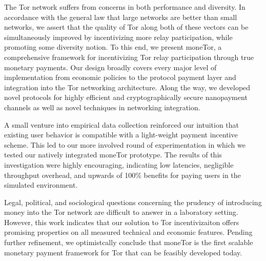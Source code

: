The Tor network suffers from concerns in both performance and diversity. In
accordance with the general law that large networks are better than small
networks, we assert that the quality of Tor along both of these vectors can be
simultaneously improved by incentivizing more relay participation, while
promoting some diversity notion. To this end, we present moneTor, a
comprehensive framework for incentivizing Tor relay participation through true
monetary payments. Our design broadly covers every major level of implementation
from economic policies to the protocol payment layer and integration into the
Tor networking architecture. Along the way, we developed novel protocols for
highly efficient and cryptographically secure nanopayment channels as well as
novel techniques in networking integration.

A small venture into empirical data collection reinforced our intuition that
existing user behavior is compatible with a light-weight payment incentive
scheme. This led to our more involved round of experimentation in which we
tested our natively integrated moneTor prototype. The results of this
investigation were highly encouraging, indicating low latencies, negligible
throughput overhead, and upwards of 100\% benefits for paying users in the
simulated environment.

Legal, political, and sociological questions concerning the prudency of
introducing money into the Tor network are difficult to answer in a laboratory
setting. However, this work indicates that our solution to Tor incentivizaiton
offers promising properties on all measured technical and economic
features. Pending further refinement, we optimistcally conclude that moneTor is
the first scalable monetary payment framework for Tor that can be feasibly
developed today.